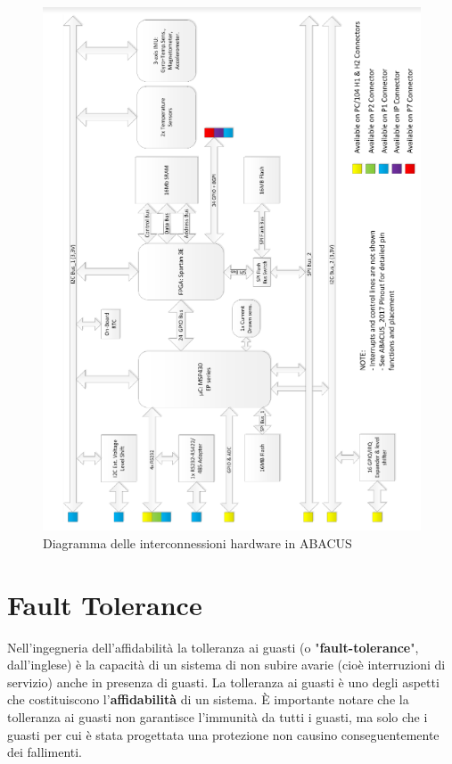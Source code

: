\documentclass[LaM,binding=0.6cm,oneside]{../sapthesis}
\begin{document}
    \begin{figure}[htbp]
    \centerline{\includegraphics[scale=.8]{examples/AbacusDiagram.PNG}}
    \caption{Diagramma delle interconnessioni hardware in ABACUS}
    \label{fig}
    \end{figure}
\clearpage
\chapter{Fault Tolerance}
Nell'ingegneria dell'affidabilità la tolleranza ai guasti (o "\textbf{fault-tolerance}", dall'inglese) è la capacità di un sistema di non subire avarie (cioè interruzioni di servizio) anche in presenza di guasti. La tolleranza ai guasti è uno degli aspetti che costituiscono l'\textbf{affidabilità} di un sistema. È importante notare che la tolleranza ai guasti non garantisce l'immunità da tutti i guasti, ma solo che i guasti per cui è stata progettata una protezione non causino conseguentemente dei  fallimenti.
\end{document}
